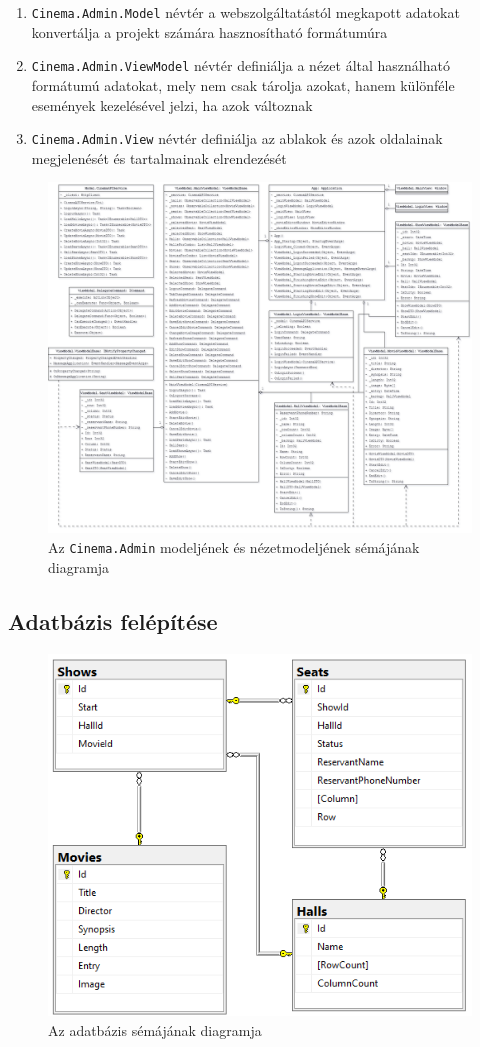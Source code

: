 \documentclass{article}
\begin{document}
\begin{itemize}
\begin{enumerate}
			\begin{enumerate}
				\item \texttt{Cinema.Admin.Model} névtér a webszolgáltatástól megkapott adatokat konvertálja a projekt számára hasznosítható formátumúra
				\item \texttt{Cinema.Admin.ViewModel} névtér definiálja a nézet által használható formátumú adatokat, mely nem csak tárolja azokat, hanem különféle események kezelésével jelzi, ha azok változnak
				\item \texttt{Cinema.Admin.View} névtér definiálja az ablakok és azok oldalainak megjelenését és tartalmainak elrendezését
			\end{enumerate}
				\begin{figure}[H]
				\centering
				\includegraphics[width=\textwidth]{admin}
				\caption{Az \texttt{Cinema.Admin} modeljének és nézetmodeljének sémájának diagramja}
			\end{figure}
		\end{enumerate}
	\end{itemize}
	\subsection*{Adatbázis felépítése}
	\begin{figure}[H]
		\centering
				\includegraphics[width=\textwidth]{database}
		\caption{Az adatbázis sémájának diagramja}
	\end{figure}
\end{document}
